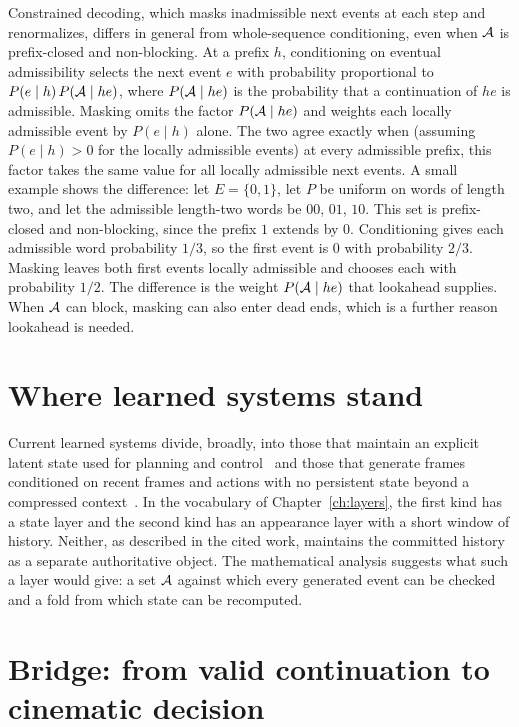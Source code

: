 \begin{remark}\label{rem:masking}
Constrained decoding, which masks inadmissible next events at each step and renormalizes, differs in general from whole-sequence conditioning, even when $\mathcal{A}$ is prefix-closed and non-blocking. At a prefix $h$, conditioning on eventual admissibility selects the next event $e$ with probability proportional to $P(e\mid h)\,P(\mathcal{A}\mid he)$, where $P(\mathcal{A}\mid he)$ is the probability that a continuation of $he$ is admissible. Masking omits the factor $P(\mathcal{A}\mid he)$ and weights each locally admissible event by $P(e\mid h)$ alone. The two agree exactly when (assuming $P(e\mid h)>0$ for the locally admissible events) at every admissible prefix, this factor takes the same value for all locally admissible next events. A small example shows the difference: let $E=\{0,1\}$, let $P$ be uniform on words of length two, and let the admissible length-two words be $00$, $01$, $10$. This set is prefix-closed and non-blocking, since the prefix $1$ extends by $0$. Conditioning gives each admissible word probability $1/3$, so the first event is $0$ with probability $2/3$. Masking leaves both first events locally admissible and chooses each with probability $1/2$. The difference is the weight $P(\mathcal{A}\mid he)$ that lookahead supplies. When $\mathcal{A}$ can block, masking can also enter dead ends, which is a further reason lookahead is needed.
\end{remark}

\section{Where learned systems stand}

Current learned systems divide, broadly, into those that maintain an explicit latent state used for planning and control~\cite{ha2018worldmodels,hafner2020dreamer} and those that generate frames conditioned on recent frames and actions with no persistent state beyond a compressed context~\cite{valevski2024gamengen,bruce2024genie}. In the vocabulary of Chapter~\ref{ch:layers}, the first kind has a state layer and the second kind has an appearance layer with a short window of history. Neither, as described in the cited work, maintains the committed history as a separate authoritative object. The mathematical analysis suggests what such a layer would give: a set $\mathcal{A}$ against which every generated event can be checked and a fold from which state can be recomputed.

\section{Bridge: from valid continuation to cinematic decision}

